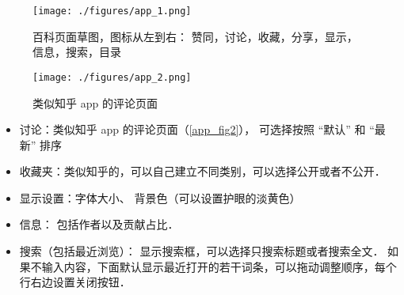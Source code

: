 
\begin{figure}[ht]
\centering
\texttt{[image: ./figures/app\_1.png]}
\caption{百科页面草图，图标从左到右： 赞同，讨论，收藏，分享，显示，信息，搜索，目录}\label{app_fig1}
\end{figure}

\begin{figure}[ht]
\centering
\texttt{[image: ./figures/app\_2.png]}
\caption{类似知乎 app 的评论页面} \label{app_fig2}
\end{figure}

\begin{itemize}
\item 讨论：类似知乎 app 的评论页面（\autoref{app_fig2}）， 可选择按照 “默认” 和 “最新” 排序
\item 收藏夹：类似知乎的，可以自己建立不同类别，可以选择公开或者不公开．
\item 显示设置：字体大小、 背景色（可以设置护眼的淡黄色）
\item 信息： 包括作者以及贡献占比．
\item 搜索（包括最近浏览）： 显示搜索框，可以选择只搜索标题或者搜索全文． 如果不输入内容，下面默认显示最近打开的若干词条，可以拖动调整顺序，每个行右边设置关闭按钮．
\end{itemize}
